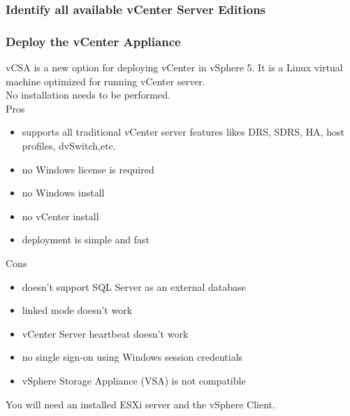 \subsubsection{Identify all available vCenter Server Editions}

\subsubsection{Deploy the vCenter Appliance}

vCSA is a new option for deploying vCenter in vSphere 5. It is a Linux virtual
machine optimized for running vCenter server.\\

No installation needs to be performed.\\

Pros

\begin{itemize}
\item supports all traditional vCenter server features likes DRS, SDRS, HA,
host profiles, dvSwitch,etc.
\item no Windows license is required
\item no Windows install
\item no vCenter install
\item deployment is simple and fast
\end{itemize}

Cons

\begin{itemize}
\item doesn't support SQL Server as an external database
\item linked mode doesn't work
\item vCenter Server heartbeat doesn't work
\item no single sign-on using Windows session credentials
\item vSphere Storage Appliance (VSA) is not compatible
\end{itemize}

You will need an installed ESXi server and the vSphere Client.

